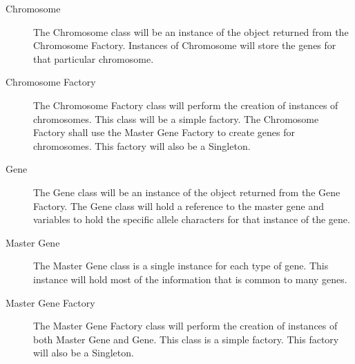 \documentclass{article}
\begin{document}
\begin{description}
\item[Chromosome] The Chromosome class will be an instance of the object returned from the Chromosome Factory. Instances of Chromosome will store the genes for that particular chromosome. 

\item[Chromosome Factory] The Chromosome Factory class will perform the creation of instances of chromosomes. This class will be a simple factory. The Chromosome Factory shall use the Master Gene Factory to create genes for chromosomes. This factory will also be a Singleton.

\item[Gene] The Gene class will be an instance of the object returned from the Gene Factory. The Gene class will hold a reference to the master gene and variables to hold the specific allele characters for that instance of the gene.

\item[Master Gene] The Master Gene class is a single instance for each type of gene. This instance will hold most of the information that is common to many genes.

\item[Master Gene Factory] The Master Gene Factory class will perform the creation of instances of both Master Gene and Gene. This class is a simple factory. This factory will also be a Singleton.

\end{description}

\end{document}
